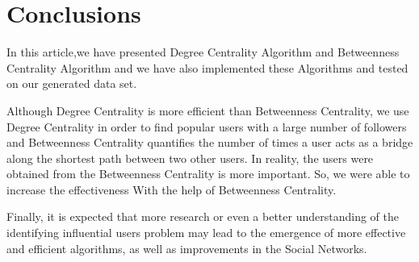 \documentclass[twocolumn,11pt]{asme2ej}
\begin{document}
\section{Conclusions}
In this article,we have presented Degree Centrality Algorithm and Betweenness Centrality Algorithm and we have also implemented these Algorithms and tested on our generated data set.

Although  Degree Centrality is more efficient than Betweenness Centrality, we use Degree Centrality in order to find popular users with a large number of followers and Betweenness Centrality quantifies the number of times a user acts as a bridge along the shortest path between two other users. In reality, the users were obtained from the Betweenness Centrality is more important. So, we were able to increase the effectiveness With the help of Betweenness Centrality.

Finally, it is expected that more research or even
a better understanding of the identifying influential users problem may lead to the emergence of more effective and efficient algorithms, as well as improvements in the Social Networks.\cite{art}



\end{document}
